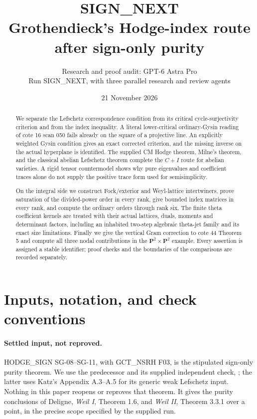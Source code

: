 \documentclass[11pt,a4paper]{article}
\title{\textbf{SIGN\_NEXT}\\[4pt]
Grothendieck's Hodge-index route after sign-only purity}
\author{Research and proof audit: GPT-6 Astra Pro\\
\small Run SIGN\_NEXT, with three parallel research and review agents}
\date{21 November 2026}
\theoremstyle{definition}
\theoremstyle{remark}
\begin{document}
\maketitle
\begin{abstract}
We separate the Lefschetz correspondence condition from its critical
cycle-surjectivity criterion and from the index inequality. A literal
lower-critical ordinary-Gysin reading of cote 16 scan 050 fails already
on the square of a projective line. An explicitly weighted Gysin
condition gives an exact corrected criterion, and the missing
inverse on the actual hyperplane is identified. The supplied CM Hodge
theorem, Milne's theorem, and the classical abelian Lefschetz theorem
complete the $C+I$ route for abelian varieties. A rigid tensor
countermodel shows why pure eigenvalues and coefficient traces alone
do not supply the positive trace form used for semisimplicity.

On the integral side we construct Fock/exterior and Weyl-lattice
intertwiners, prove saturation of the divided-power order in every
rank, give bounded index matrices in every rank, and compute the
ordinary orders through rank six. The finite
theta coefficient kernels are treated with their actual lattices,
duals, moments and determinant factors, including an inhabited
two-step algebraic theta-jet family and its exact size limitations.
Finally we give the vertical
Gram correction to cote 44 Theorem 5 and compute all three nodal
contributions in the $\mathbf P^2\times\mathbf P^2$ example. Every
assertion is assigned a stable identifier; proof checks and the
boundaries of the comparisons are recorded separately.
\end{abstract}
\tableofcontents
\clearpage
\section*{Inputs, notation, and check conventions}

\paragraph{Settled input, not reproved.}
HODGE\_SIGN SG-08--SG-11, with GCT\_NSRH F03, is the stipulated
sign-only purity theorem. We use the predecessor and its supplied
independent check, ; the latter
uses Katz's Appendix A.3--A.5 for its generic weak Lefschetz input.
Nothing in this paper reopens or reproves that theorem. It gives the
purity conclusions of Deligne, \emph{Weil I}, Theorem 1.6, and
\emph{Weil II}, Theorem 3.3.1 over a point, in the precise scope
specified by the supplied run.
\end{document}
